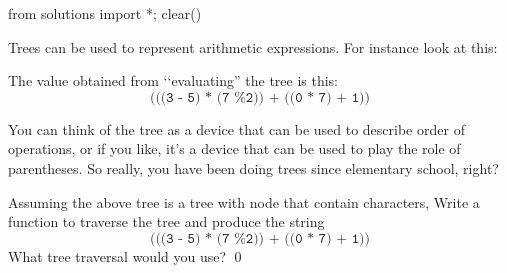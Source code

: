 \begin{python0}
from solutions import *; clear()
\end{python0}

Trees can be used to represent arithmetic expressions.
For instance look at this:



The value obtained from \lq\lq evaluating'' the tree is this:
\[
\texttt{(((3 - 5) * (7 \% 2)) + ((0 * 7) + 1))}
\]

You can think of the tree as a device that can be used to describe
order of operations, or if you like, it's a device that can be 
used to play the role of parentheses.
So really, you have been doing trees since elementary school, right?

\begin{ex}
Assuming the above tree is a tree with node that contain characters,
Write a function to traverse the tree and produce the 
string
\[
\texttt{(((3 - 5) * (7 \% 2)) + ((0 * 7) + 1))}
\]
What tree traversal would you use?
\qed
\end{ex}
